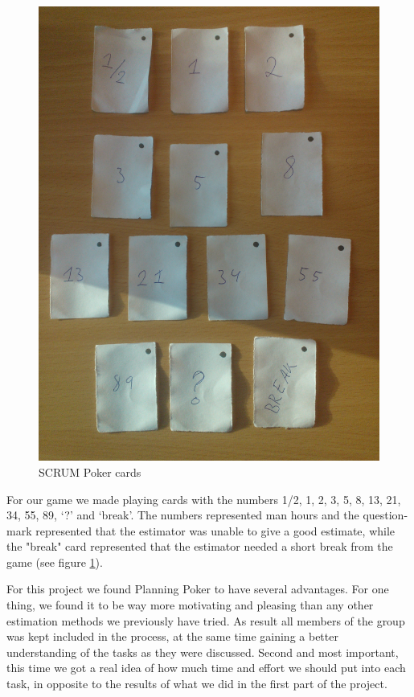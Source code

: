 \begin{figure}[t]
  \centering
  \includegraphics[width=\textwidth, angle=270]{illustrations/scrumPokerCards.jpg}
  \caption{SCRUM Poker cards}
  \label{fig:scrumPokerCards}
\end{figure}

For our game we made playing cards with the numbers 1/2, 1, 2, 3, 5, 8, 13, 21, 34, 55, 89, `?' and `break'. The numbers represented man hours and the question-mark represented that the estimator was unable to give a good estimate, while the "break" card represented that the estimator needed a short break from the game (see figure \ref{fig:scrumPokerCards}).

For this project we found Planning Poker to have several advantages. For one thing, we found it to be way more motivating and pleasing than any other estimation methods we previously have tried. As result all members of the group was kept included in the process, at the same time gaining a better understanding of the tasks as they were discussed.
Second and most important, this time we got a real idea of how much time and effort we should put into each task, in opposite to the results of what we did in the first part of the project.

